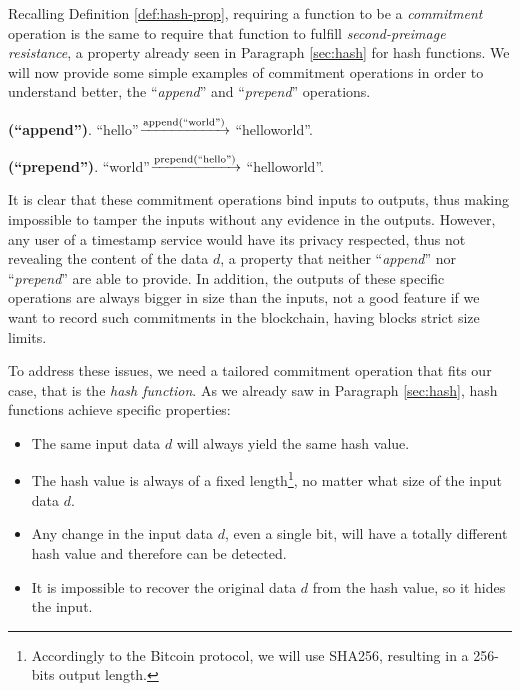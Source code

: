 \bigskip
\noindent
Recalling Definition \ref{def:hash-prop}, requiring a function to be a \textit{commitment} operation is the same to require that function to fulfill \textit{second-preimage resistance}, a property already seen in Paragraph \ref{sec:hash} for hash functions. We will now provide some simple examples of commitment operations in order to understand better, the \enquote{\textit{append}} and \enquote{\textit{prepend}} operations.
\begin{myexample}{\bf (\enquote{append})}.
    \textquotedblleft hello\textquotedblright $\xrightarrow{\text{append(\textquotedblleft world\textquotedblright)}}$ \textquotedblleft helloworld\textquotedblright.
\end{myexample}
\begin{myexample}{\bf (\enquote{prepend})}.
    \textquotedblleft world\textquotedblright $\xrightarrow{\text{prepend(\textquotedblleft hello\textquotedblright)}}$ \textquotedblleft helloworld\textquotedblright.
\end{myexample}

\bigskip
\noindent
It is clear that these commitment operations bind inputs to outputs, thus making impossible to tamper the inputs without any evidence in the outputs. However, any user of a timestamp service would have its privacy respected, thus not revealing the content of the data $d$, a property that neither \enquote{\textit{append}} nor \enquote{\textit{prepend}} are able to provide. In addition, the outputs of these specific operations are always bigger in size than the inputs, not a good feature if we want to record such commitments in the blockchain, having blocks strict size limits.

\bigskip
\noindent
To address these issues, we need a tailored commitment operation that fits our case, that is the \textit{hash function}. As we already saw in Paragraph \ref{sec:hash}, hash functions achieve specific properties:
\begin{itemize}
    \item The same input data $d$ will always yield the same hash value.
    \item The hash value is always of a fixed length\footnote{Accordingly to the Bitcoin protocol, we will use SHA256, resulting in a 256-bits output length.}, no matter what size of the input data $d$.
    \item Any change in the input data $d$, even a single bit, will have a totally different hash value and therefore can be detected.
    \item It is impossible to recover the original data $d$ from the hash value, so it hides the input.
\end{itemize}


